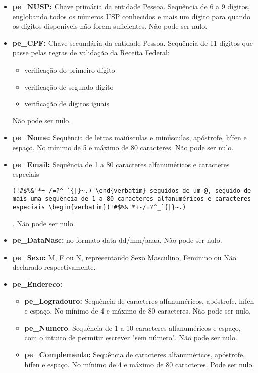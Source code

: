 \documentclass{report}
\begin{document}
\begin{itemize}
  \item \textbf{pe\_NUSP:} Chave primária da entidade Pessoa. Sequência de 6 a 9 dígitos, englobando todos os números USP conhecidos e mais um dígito para quando os dígitos disponíveis não forem suficientes. Não pode ser nulo.
  \item \textbf{pe\_CPF:} Chave secundária da entidade Pessoa. Sequência de 11 dígitos que passe pelas regras de validação da Receita Federal:
  \begin{itemize}
    \item verificação do primeiro dígito
    \item verificação de segundo dígito
    \item verificação de dígitos iguais
  \end{itemize}
  Não pode ser nulo.
  \item \textbf{pe\_Nome:} Sequência de letras maiúsculas e minúsculas, apóstrofe, hífen e espaço. No mínimo de 5 e máximo de 80 caracteres. Não pode ser nulo.
  \item \textbf{pe\_Email:} Sequência de 1 a 80 caracteres alfanuméricos e caracteres especiais \begin{verbatim}(!#$%&'*+-/=?^_`{|}~.) \end{verbatim} seguidos de um @, seguido de mais uma sequência de 1 a 80 caracteres alfanuméricos e caracteres especiais \begin{verbatim}(!#$%&'*+-/=?^_`{|}~.)
  \end{verbatim} .
  Não pode ser nulo.
  \item \textbf{pe\_DataNasc:} no formato data dd/mm/aaaa. Não pode ser nulo.
  \item \textbf{pe\_Sexo:} M, F ou N, representando Sexo Masculino, Feminino ou Não declarado respectivamente.
  \item \textbf{pe\_Endereco:}
  \begin{itemize}
    \item \textbf{pe\_Logradouro:} Sequência de caracteres alfanuméricos, apóstrofe, hífen e espaço. No mínimo de 4 e máximo de 80 caracteres. Não pode ser nulo.
    \item \textbf{pe\_Numero}: Sequência de 1 a 10 caracteres alfanuméricos e espaço, com o intuito de permitir escrever "sem número". Não pode ser nulo.
    \item \textbf{pe\_Complemento:} Sequência de caracteres alfanuméricos, apóstrofe, hífen e espaço. No mínimo de 4 e máximo de 80 caracteres. Pode ser nulo.

\end{itemize}
\end{itemize}
\end{document}
